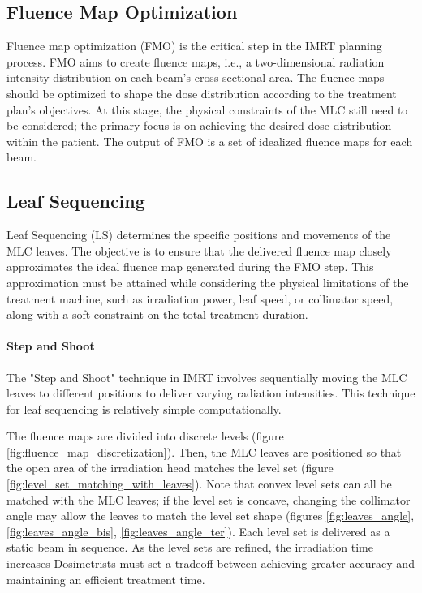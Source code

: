 \subsection[FMO]{Fluence Map Optimization}
Fluence map optimization (FMO) is the critical step in the IMRT planning process.
FMO aims to create fluence maps, i.e., a two-dimensional radiation intensity distribution on each beam's cross-sectional area.
The fluence maps should be optimized to shape the dose distribution according to the treatment plan's objectives.
At this stage, the physical constraints of the MLC still need to be considered; the primary focus is on achieving the desired dose distribution within the patient.
The output of FMO is a set of idealized fluence maps for each beam.

\subsection[LS]{Leaf Sequencing}
Leaf Sequencing (LS) determines the specific positions and movements of the MLC leaves.
The objective is to ensure that the delivered fluence map closely approximates the ideal fluence map generated during the FMO step.
This approximation must be attained while considering the physical limitations of the treatment machine, such as irradiation power, leaf speed, or collimator speed, along with a soft constraint on the total treatment duration.

\paragraph[S\&S]{Step and Shoot}
The "Step and Shoot" technique in IMRT involves sequentially moving the MLC leaves to different positions to deliver varying radiation intensities.
This technique for leaf sequencing is relatively simple computationally.

The fluence maps are divided into discrete levels (figure \ref{fig:fluence_map_discretization}).
Then, the MLC leaves are positioned so that the open area of the irradiation head matches the level set (figure \ref{fig:level_set_matching_with_leaves}).
Note that convex level sets can all be matched with the MLC leaves; if the level set is concave, changing the collimator angle may allow the leaves to match the level set shape (figures \ref{fig:leaves_angle}, \ref{fig:leaves_angle_bis}, \ref{fig:leaves_angle_ter}).
Each level set is delivered as a static beam in sequence.
As the level sets are refined, the irradiation time increases
Dosimetrists must set a tradeoff between achieving greater accuracy and maintaining an efficient treatment time.


